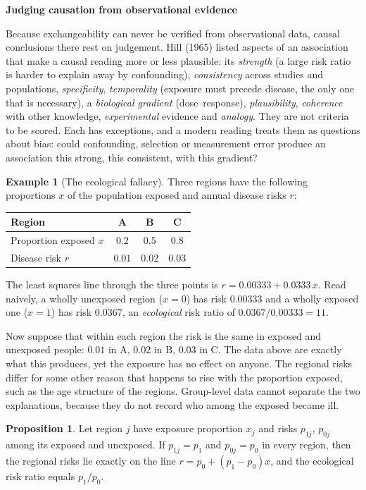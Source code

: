 \documentclass[11pt,a4paper]{article}
\numberwithin{equation}{section}
\theoremstyle{definition}
\newtheorem{exa}[thm]{Example}
\newtheorem{prop}[thm]{Proposition}
\newcommand{\subhead}[1]{%
  \par\medskip\noindent\textbf{#1}\par\nobreak\smallskip}
\begin{document}
\subhead{Judging causation from observational evidence}

Because exchangeability can never be verified from observational data, causal conclusions there rest on judgement. Hill (1965) listed
aspects of an association that make a causal reading more or less plausible: its \emph{strength} (a large risk ratio is harder to explain
away by confounding), \emph{consistency} across studies and populations, \emph{specificity}, \emph{temporality} (exposure must precede
disease, the only one that is necessary), a \emph{biological gradient} (dose--response), \emph{plausibility}, \emph{coherence} with
other knowledge, \emph{experimental} evidence and \emph{analogy}. They are not criteria to be scored. Each has exceptions, and a modern
reading treats them as questions about bias: could confounding, selection or measurement error produce an association this strong, this
consistent, with this gradient?

\begin{exa}[The ecological fallacy]
\label{exa:ecological}
Three regions have the following proportions $x$ of the population exposed and annual disease risks $r$:
\begin{center}
\begin{tabular}{lccc}
\hline
Region & A & B & C \\
\hline
Proportion exposed $x$ & $0.2$ & $0.5$ & $0.8$ \\
Disease risk $r$ & $0.01$ & $0.02$ & $0.03$ \\
\hline
\end{tabular}
\end{center}
The least squares line through the three points is $r = 0.00333 + 0.0333\,x$. Read naively, a wholly unexposed region ($x = 0$) has risk
$0.00333$ and a wholly exposed one ($x = 1$) has risk $0.0367$, an \emph{ecological} risk ratio of $0.0367/0.00333 = 11$.

Now suppose that within each region the risk is the same in exposed and unexposed people: $0.01$ in A, $0.02$ in B, $0.03$ in C. The data
above are exactly what this produces, yet the exposure has no effect on anyone. The regional risks differ for some other reason that
happens to rise with the proportion exposed, such as the age structure of the regions. Group-level data cannot separate the two
explanations, because they do not record who among the exposed became ill.
\end{exa}

\begin{prop}
Let region $j$ have exposure proportion $x_j$ and risks $p_{1j}$, $p_{0j}$ among its exposed and unexposed. If $p_{1j} = p_1$ and $p_{0j} = p_0$ in every
region, then the regional risks lie exactly on the line $r = p_0 + (p_1 - p_0)x$, and the ecological risk ratio equals $p_1/p_0$.
\end{prop}
\end{document}
